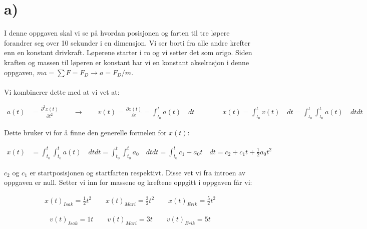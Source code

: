 \pagebreak


\pagebreak



\section*{a)}%

I denne oppgaven skal vi se på hvordan posisjonen og farten til tre løpere forandrer seg over 10 sekunder i en dimensjon. Vi ser borti fra alle andre krefter
enn en konstant drivkraft. Løperene starter i ro og vi setter det som origo.
Siden kraften og massen til løperen er konstant har vi en konstant akselrasjon
i denne oppgaven, $ma = \sum F = F_D \rightarrow a = F_D/m$.
\\
\\
Vi kombinerer dette med at vi vet at:

\begin{align*}
  a(t) &= \frac{\partial ^2x(t)}{\partial  t^2}
  \qquad \rightarrow \qquad
  v(t) =\frac{\partial x(t)}{\partial  t} = \int_{t_0}^{t}a(t) \quad dt
  \qquad \qquad
  x(t) = \int_{t_0}^{t}v(t) \quad dt  = \int_{t_0}^{t}\int_{t_0}^{t}a(t) \quad dt dt
\end{align*}

Dette bruker vi for å finne den generelle formelen for $x(t)$:

\begin{align*}
  x(t)  &= \int_{t_0}^{t}\int_{t_0}^{t}a(t) \quad dt dt
  = \int_{t_0}^{t}\int_{t_0}^{t}a_0 \quad dt dt
  = \int_{t_0}^{t}c_1  + a_0t \quad dt
  =  c_2 + c_1t + \frac{1}{2}a_0t^2
\end{align*}

$c_2$ og $c_1$ er startposisjonen og startfarten respektivt.
Disse vet vi fra introen av oppgaven er null. Setter vi inn for massene og kreftene oppgitt i oppgaven får vi:

\begin{align}
  x(t)_{Isak} = \frac{1}{2}t^2
  \qquad
  x(t)_{Mari} = \frac{3}{2}t^2
  \qquad
  x(t)_{Erik} = \frac{5}{2}t^2
  \label{eq:test_posisjon}
\end{align}

\begin{align}
  v(t)_{Isak} = 1t
  \qquad
  v(t)_{Mari} = 3t
  \qquad
  v(t)_{Erik} = 5t
  \label{eq:test_fart}
\end{align}

